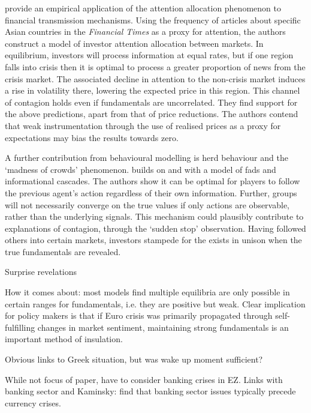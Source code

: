 \documentclass[../base.tex]{subfiles}
\begin{document}
\cite{mondria2013financial} provide an empirical application of the attention allocation phenomenon to financial transmission mechanisms. Using the frequency of articles about specific Asian countries in the \textit{Financial Times} as a proxy for attention, the authors construct a model of investor attention allocation between markets. In equilibrium, investors will process information at equal rates, but if one region falls into crisis then it is optimal to process a greater proportion of news from the crisis market. The associated decline in attention to the non-crisis market induces a rise in volatility there, lowering the expected price in this region. This channel of contagion holds even if fundamentals are uncorrelated. They find support for the above predictions, apart from that of price reductions. The authors contend that weak instrumentation through the use of realised prices as a proxy for expectations may bias the results towards zero. 

A further contribution from behavioural modelling is herd behaviour and the `madness of crowds' phenomenon. \cite{bikhchandani1998learning} builds on \cite{bikhchandani1992theory} and \cite{banerjee1992simple} with a model of fads and informational cascades. The authors show it can be optimal for players to follow the previous agent's action regardless of their own information. Further, groups will not necessarily converge on the true values if only actions are observable, rather than the underlying signals. This mechanism could plausibly contribute to explanations of contagion, through the  \cite{kaminsky2003unholy} `sudden stop' observation. Having followed others into certain markets, investors stampede for the exists in unison when the true fundamentals are revealed.

Surprise revelations

How it comes about: most models find multiple equilibria are only possible in certain ranges for fundamentals, i.e. they are positive but weak. Clear implication for policy makers is that if Euro crisis was primarily propagated through self-fulfilling changes in market sentiment, maintaining strong fundamentals is an important method of insulation. 


Obvious links to Greek situation, but was wake up moment sufficient?

While not focus of paper, have to consider banking crises in EZ.
Links with banking sector \cite{alter2012credit} and \cite{kaminsky1999twin}
Kaminsky: find that banking sector issues typically precede currency crises.
\end{document}
